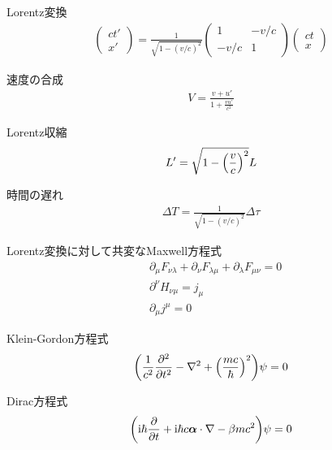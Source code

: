 \documentclass{report}
\begin{document}
  \begin{itembox}[l]{Lorentz変換}
    \begin{align}
      \label{LorentzTransformation}
      \begin{pmatrix}
        ct' \\ x'
      \end{pmatrix}
      =
      \frac{1}{\sqrt{1 - (v/c)^2}}
      \begin{pmatrix}
        1 & -v/c\\
        -v/c & 1
      \end{pmatrix}
      \begin{pmatrix}
        ct\\x
      \end{pmatrix}
    \end{align}
  \end{itembox}

  \begin{itembox}[l]{速度の合成}
    \begin{align}
      V = \frac{v + u'}{1 + \frac{vu'}{c^2}}
    \end{align}
  \end{itembox}

  \begin{itembox}[l]{Lorentz収縮}
    \begin{align}
      L' = \sqrt{1-\qty(\frac{v}{c})^2}L
    \end{align}
  \end{itembox}

  \begin{itembox}[l]{時間の遅れ}
    \begin{align}
      \Delta T = \frac{1}{\sqrt{1 - (v/c)^2}} \Delta \tau
    \end{align}
  \end{itembox}

  \begin{itembox}[l]{Lorentz変換に対して共変なMaxwell方程式}
    \begin{align}
      &\partial_\mu F_{\nu\lambda} + \partial_\nu F_{\lambda\mu} + \partial_\lambda F_{\mu\nu} = 0\\
      &\partial^{\nu}H_{\nu\mu}=j_\mu\\
      &\partial_\mu j^\mu = 0
    \end{align}
  \end{itembox}

  \begin{itembox}[l]{Klein-Gordon方程式}
    \begin{equation}
      \qty(\frac{1}{c^2}\frac{\partial^2}{\partial t^2} - \nabla^2 + \qty(\frac{mc}{\hbar})^2)\psi = 0
    \end{equation}
  \end{itembox}

  \begin{itembox}[l]{Dirac方程式}
    \begin{align}
      \qty(\mathrm{i}\hbar \frac{\partial}{\partial t} + \mathrm{i} \hbar c \bm{\alpha}\cdot \nabla - \beta mc^2)\psi = 0
    \end{align}
    \end{itembox}
\end{document}
